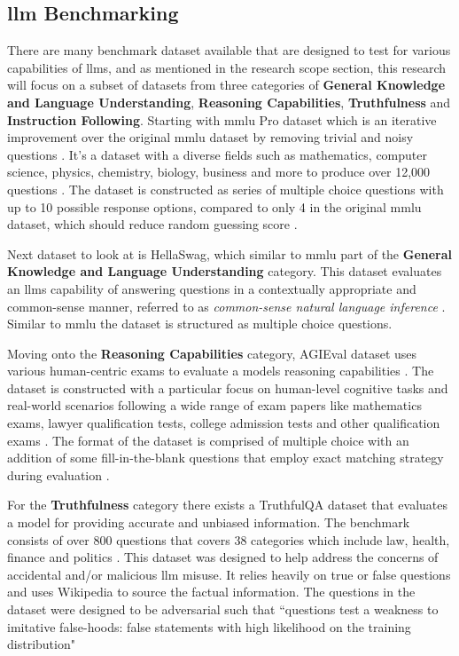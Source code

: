 \documentclass{ifacconf}
\begin{document}
	\subsection{\gls{llm} Benchmarking}
	
	There are many benchmark dataset available that are designed to test for various capabilities of \glspl{llm}, and as mentioned in the research scope section, this research will focus on a subset of datasets from three categories of \textbf{General Knowledge and Language Understanding}, \textbf{Reasoning Capabilities}, \textbf{Truthfulness} and \textbf{Instruction Following}. Starting with \gls{mmlu} Pro dataset which is an iterative improvement over the original \gls{mmlu} dataset by removing trivial and noisy questions \cite{wang2024mmluprorobustchallengingmultitask}. It's a dataset with a diverse fields such as mathematics, computer science, physics, chemistry, biology, business and more to produce over 12,000 questions \cite{wang2024mmluprorobustchallengingmultitask}. The dataset is constructed as series of multiple choice questions with up to 10 possible response options, compared to only 4 in the original \gls{mmlu} dataset, which should reduce random guessing score \cite{mmluprohuggingface}.
	
	Next dataset to look at is HellaSwag, which similar to \gls{mmlu} part of the \textbf{General Knowledge and Language Understanding} category. This dataset evaluates an \glspl{llm} capability of answering questions in a contextually appropriate and common-sense manner, referred to as \textit{common-sense natural language inference} \cite{zellers2019hellaswagmachinereallyfinish}. Similar to \gls{mmlu} the dataset is structured as multiple choice questions.
	
	Moving onto the \textbf{Reasoning Capabilities} category, AGIEval dataset uses various human-centric exams to evaluate a models reasoning capabilities \cite{zhong2023agievalhumancentricbenchmarkevaluating}. The dataset is constructed with a particular focus on human-level cognitive tasks and real-world scenarios following a wide range of exam papers like mathematics exams, lawyer qualification tests, college admission tests and other qualification exams \cite[p.~5]{zhong2023agievalhumancentricbenchmarkevaluating}. The format of the dataset is comprised of multiple choice with an addition of some fill-in-the-blank questions that employ exact matching strategy during evaluation \cite[p.~6]{zhong2023agievalhumancentricbenchmarkevaluating}.
	
	For the \textbf{Truthfulness} category there exists a TruthfulQA dataset that evaluates a model for providing accurate and unbiased information. The benchmark consists of over 800 questions that covers 38 categories which include law, health, finance and politics \cite{lin2022truthfulqameasuringmodelsmimic}. This dataset was designed to help address the concerns of accidental and/or malicious \gls{llm} misuse. It relies heavily on true or false questions and uses Wikipedia to source the factual information. The questions in the dataset were designed to be adversarial such that ``questions test a weakness to imitative false-hoods: false statements with high likelihood on the training distribution" \cite[p.~4]{lin2022truthfulqameasuringmodelsmimic}
	
\end{document}

